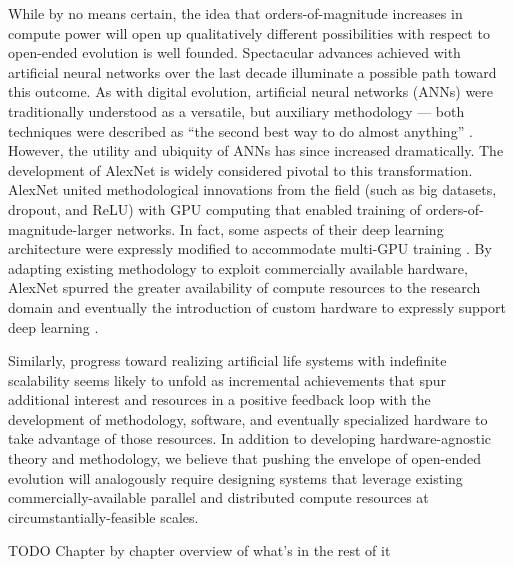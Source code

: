 While by no means certain, the idea that orders-of-magnitude increases in compute power will open up qualitatively different possibilities with respect to open-ended evolution is well founded.
Spectacular advances achieved with artificial neural networks over the last decade illuminate a possible path toward this outcome. As with digital evolution, artificial neural networks (ANNs) were traditionally understood as a versatile, but auxiliary methodology — both techniques were described as “the second best way to do almost anything” \cite{miaoulis2008intelligent,eiben2015introduction}.
However, the utility and ubiquity of ANNs has since increased dramatically. The development of AlexNet is widely considered pivotal to this transformation. AlexNet united methodological innovations from the field (such as big datasets, dropout, and ReLU) with GPU computing that enabled training of orders-of-magnitude-larger networks.
In fact, some aspects of their deep learning architecture were expressly modified to accommodate multi-GPU training \cite{krizhevsky2012imagenet}.
By adapting existing methodology to exploit commercially available hardware, AlexNet spurred the greater availability of compute resources to the research domain and eventually the introduction of custom hardware to expressly support deep learning \cite{jouppi2017datacenter}.

Similarly, progress toward realizing artificial life systems with indefinite scalability seems likely to unfold as incremental achievements that spur additional interest and resources in a positive feedback loop with the development of methodology, software, and eventually specialized hardware to take advantage of those resources.
In addition to developing hardware-agnostic theory and methodology, we believe that pushing the envelope of open-ended evolution will analogously require designing systems that leverage existing commercially-available parallel and distributed compute resources at circumstantially-feasible scales.

TODO Chapter by chapter overview of what’s in the rest of it
